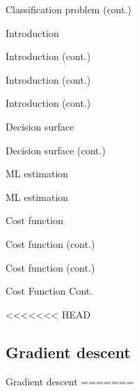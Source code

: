 \documentclass[serif, aspectratio=169]{beamer}
\begin{document}
\begin{frame}{Classification problem (cont.)}
\begin{itemize}
\begin{frame}{Introduction}
\begin{itemize}
\begin{frame}{Introduction (cont.)}
\begin{frame}{Introduction (cont.)}
\begin{frame}{Introduction (cont.)}
\begin{frame}{Decision surface}
\begin{itemize}
\begin{frame}{Decision surface (cont.)}
\begin{frame}{ML estimation}
\begin{frame}{ML estimation}
\begin{itemize}
\begin{frame}{Cost function}
\begin{frame}{Cost function (cont.)}
\begin{itemize}
\begin{itemize}
\begin{frame}{Cost function (cont.)}
\begin{frame}{Cost Function Cont.}
\begin{center}
    \end{center}
    \vfill
\end{frame}


<<<<<<< HEAD
\subsection{Gradient descent}
\begin{frame}{Gradient descent}
=======

\end{frame}
\end{frame}
\end{itemize}
\end{itemize}
\end{frame}
\end{frame}
\end{itemize}
\end{frame}
\end{frame}
\end{frame}
\end{itemize}
\end{frame}
\end{frame}
\end{frame}
\end{frame}
\end{itemize}
\end{frame}
\end{itemize}
\end{frame}
\end{document}
